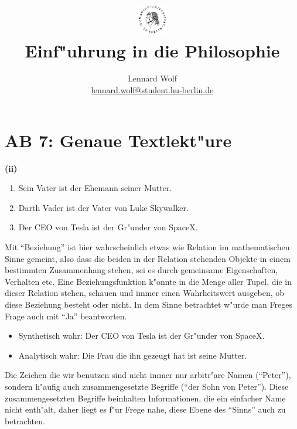 \documentclass[a4paper]{article}
\date{\vspace{-3ex}}
\begin{document}
\title{
    \vspace{-30pt}
	\includegraphics*[width=0.1\textwidth,left]{images/hu_logo2.png}\\
	\vspace{-10pt}
	Einf"uhrung in die Philosophie}
\author{Lennard Wolf\\
        \small{\href{mailto:lennard.wolf@student.hu-berlin.de}{lennard.wolf@student.hu-berlin.de}}}
\maketitle
\vspace{0pt}

\section*{AB 7: Genaue Textlekt"ure}
\large

\noindent\textbf{(ii)}

\begin{enumerate}
  \item Sein Vater ist der Ehemann seiner Mutter.
  \item Darth Vader ist der Vater von Luke Skywalker.
  \item Der CEO von Tesla ist der Gr"under von SpaceX.
\end{enumerate}

Mit "`Beziehung"' ist hier wahrscheinlich etwas wie Relation im mathematischen Sinne gemeint, also dass die beiden in der Relation stehenden Objekte in einem bestimmten Zusammenhang stehen, sei es durch gemeinsame Eigenschaften, Verhalten etc. Eine Beziehungsfunktion k"onnte in die Menge aller Tupel, die in dieser Relation stehen, schauen und immer einen Wahrheitswert ausgeben, ob diese Beziehung besteht oder nicht. In dem Sinne betrachtet w"urde man Freges Frage auch mit "`Ja"' beantworten.\\

\begin{itemize}
  \item Synthetisch wahr: Der CEO von Tesla ist der Gr"under von SpaceX.
  \item Analytisch wahr: Die Frau die ihn gezeugt hat ist seine Mutter.
\end{itemize}

Die Zeichen die wir benutzen sind nicht immer nur arbitr"are Namen ("`Peter"'), sondern h"aufig auch zusammengesetzte Begriffe ("`der Sohn von Peter"'). Diese zusammengesetzten Begriffe beinhalten Informationen, die ein einfacher Name nicht enth"alt, daher liegt es f"ur Frege nahe, diese Ebene des "`Sinns"' auch zu betrachten.
\end{document}
